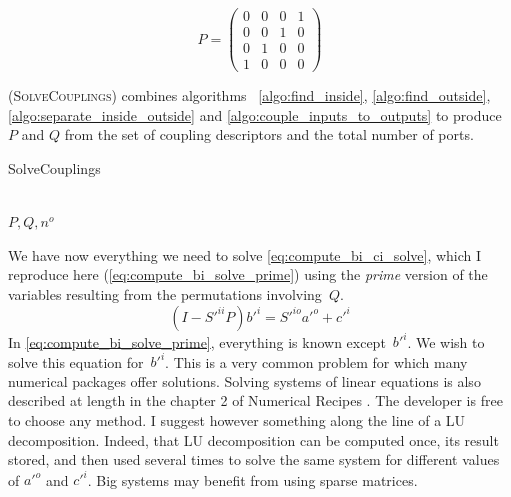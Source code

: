 \begin{equation}
    P=
    \begin{pmatrix}
        0 & 0 & 0 & 1 \\
        0 & 0 & 1 & 0 \\
        0 & 1 & 0 & 0 \\
        1 & 0 & 0 & 0
    \end{pmatrix}
    \label{eq:example_permutation_P}
\end{equation}

 (\textsc{SolveCouplings}) combines algorithms~%
\ref{algo:find_inside},
\ref{algo:find_outside},
\ref{algo:separate_inside_outside} and
\ref{algo:couple_inputs_to_outputs}
to produce $P$ and $Q$ from the set of coupling descriptors and the total number of ports.
\begin{algorithm}
    \caption{SolveCouplings}
    \label{algo:solve_couplings}
    \begin{algorithmic}
         
         
         
        \\ \Return $P, Q, n^o$
        \EndFunction
    \end{algorithmic}
\end{algorithm}

We have now everything we need to solve \cref{eq:compute_bi_ci_solve}, which I reproduce here (\cref{eq:compute_bi_solve_prime}) using the \textit{prime} version of the variables resulting from the permutations involving~$Q$.
\begin{equation}
    (I - S'^{ii}P)b'^i = S'^{io}a'^o + c'^i \label{eq:compute_bi_solve_prime}
\end{equation}
In \cref{eq:compute_bi_solve_prime}, everything is known except~$b'^i$.
We wish to solve this equation for~$b'^i$.
This is a very common problem for which many numerical packages offer solutions.
Solving systems of linear equations is also described at length in the chapter 2 of Numerical Recipes \cite{Press:2007:NRE:1403886}.
The developer is free to choose any method.
I suggest however something along the line of a LU decomposition.
Indeed, that LU decomposition can be computed once, its result stored, and then used several times to solve the same system for different values of $a'^o$ and $c'^i$.
Big systems may benefit from using sparse matrices.

